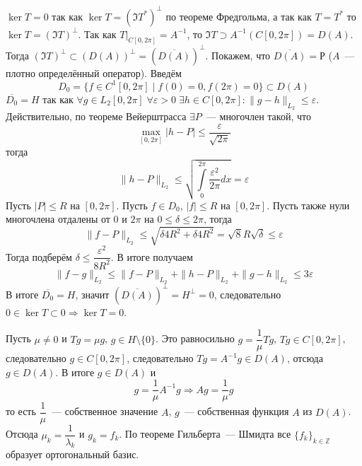 \documentclass[14pt]{extarticle}
\begin{document}
\begin{Prim}
    $\ker T = 0$ так как $\ker T = (\Im T^*)^\perp$ по теореме Фредгольма, а так как 
    $T = T^*$ то $\ker T =(\Im T)^\perp$.
    Так как $T|_{C[0,2\pi]} = A^{-1}$, то $\Im T \supset A^{-1}(C[0,2\pi]) = D(A)$.
    Тогда $(\Im T)^\perp \subset (D(A))^\perp = \left(\overline{D(A)}\right)^\perp$.
    Покажем, что $\overline{D(A)} = Р$ ($A$~--- плотно определённый оператор).
    Введём
    $$
    D_0 = \{f \in C^1[0, 2\pi] \mid f(0) = 0, f(2\pi) = 0\} \subset D(A)
    $$
    $\overline{D_0} = H$ так как $\forall g \in L_2[0,2\pi]\; \forall \varepsilon > 0\;
    \exists h \in C[0, 2\pi]\colon \|g - h\|_{L_2} \le \varepsilon$.
    Действительно, по теореме Вейерштрасса $\exists P$~--- многочлен такой, что
    $$
    \max \limits_{[0, 2\pi]} |h - P| \le \dfrac{\varepsilon}{\sqrt{2\pi}}
    $$
    тогда
    $$
    \|h - P\|_{L_2} \le \sqrt{\int\limits_0^{2 \pi}\dfrac{\varepsilon^2}{2\pi}dx} = \varepsilon
    $$
    Пусть $|P| \le R$ на $[0, 2\pi]$.
    Пусть $f \in D_0$, $|f| \le R$ на $[0, 2\pi]$.
    Пусть также нули многочлена отдалены от 0 и $2\pi$ на $0 \le \delta \le 2\pi$, тогда
    $$
    \|f - P\|_{L_2} \le \sqrt{\delta 4 R^2 + \delta 4 R^2} = \sqrt{8}R\sqrt{\delta} \le \varepsilon
    $$
    Тогда подберём $\delta \le \dfrac{\varepsilon^2}{8R^2}$.
    В итоге получаем
    $$
    \|f - g\|_{L_2} \le \|f - P\|_{L_2} + \|h - P\|_{L_2} + \|g - h\|_{L_2} \le 3 \varepsilon
    $$
    В итоге $\overline{D_0} = H$, значит $\left(\overline{D(A)}\right)^\perp = H^\perp = 0$,
    следовательно $0 \in \ker T \subset 0 \Rightarrow \ker T = 0$.
    
    Пусть $\mu \neq 0$ и $Tg = \mu g$, $g \in H \setminus\{0\}$.
    Это равносильно
    $g = \dfrac{1}{\mu}Tg$, $Tg \in C[0, 2\pi]$, следовательно $g \in C[0,2\pi]$, следовательно
    $Tg = A^{-1} g \in D(A)$, отсюда $g \in D(A)$.
    В итоге $g \in D(A)$ и
    $$
    g = \dfrac{1}{\mu}A^{-1}g \Rightarrow Ag = \dfrac{1}{\mu}g
    $$
    то есть $\dfrac{1}{\mu}$~--- собственное значение $A$, $g$~--- собственная функция $A$
    из $D(A)$.
    Отсюда $\mu_k = \dfrac{1}{\lambda_k}$ и $g_k = f_k$.
    По теореме Гильберта~--- Шмидта все $\{f_k\}_{k \in \mathbb Z}$ образует ортогональный
    базис.
\end{Prim}
\end{document}
